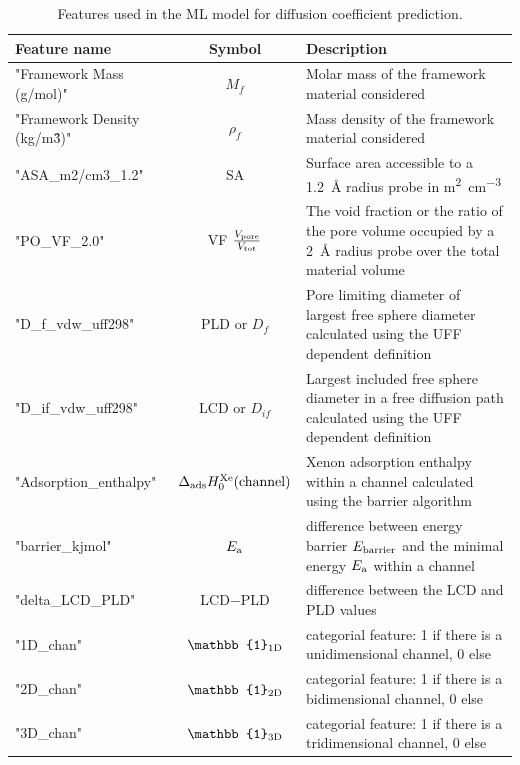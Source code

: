 \documentclass[main]{subfiles}
\begin{document}
\begin{table}[ht]
  \setlength{\extrarowheight}{1pt}
  \centering
  \begin{tabular}{|l|c|m{8cm}|}
  \hline
    Feature name  &  Symbol   &   Description\\
  \hline
      "Framework Mass (g/mol)" &   $M_f$ &   Molar mass of the framework material considered  \\
      "Framework Density (kg/m\^3)" &   $\rho_f$ &   Mass density of the framework material considered  \\
      "ASA\_m2/cm3\_1.2" &   SA &   Surface area accessible to a \SI{1.2}{\angstrom} radius probe in \si{\square\m\per\cubic\cm}  \\
      "PO\_VF\_2.0" &  VF $\tfrac{V_{\text{pore}}}{V_{\text{tot}}}$ &  The void fraction or the ratio of the pore volume occupied by a \SI{2}{\angstrom} radius probe over the total material volume  \\
      "D\_f\_vdw\_uff298" &   PLD or $D_f$  &   Pore limiting diameter of largest free sphere diameter calculated using the UFF dependent definition  \\
      "D\_if\_vdw\_uff298" &   LCD or $D_{if}$ &   Largest included free sphere diameter in a free diffusion path calculated using the UFF dependent definition  \\
      "Adsorption\_enthalpy" &   $\Delta_{\text{ads}}H_0^{\text{Xe}}(\text{channel})$  &   Xenon adsorption enthalpy within a channel calculated using the barrier algorithm  \\
      "barrier\_kjmol" &   $E_{\text{a}}$  &   difference between energy barrier $E_{\text{barrier}}$ and the minimal energy $E_{\text{a}}$ within a channel \\
      "delta\_LCD\_PLD" &   LCD$-$PLD  &   difference between the LCD and PLD values \\
      "1D\_chan" &  $\mathbb{1}\e{1D}$   &   categorial feature: 1 if there is a unidimensional channel, 0 else \\
      "2D\_chan" &  $\mathbb{1}\e{2D}$   &   categorial feature: 1 if there is a bidimensional channel, 0 else \\
      "3D\_chan" &  $\mathbb{1}\e{3D}$   &   categorial feature: 1 if there is a tridimensional channel, 0 else \\
    \hline
  \end{tabular}
  \caption{ Features used in the ML model for diffusion coefficient prediction. }\label{Table:feat_diff}
\end{table}
\end{document}
